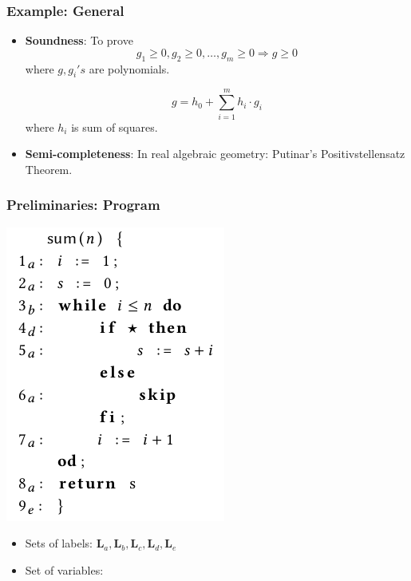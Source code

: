 \documentclass[11pt]{beamer}
\begin{document}
\begin{frame}\frametitle{Example: General}
\begin{itemize}
\item \textbf{Soundness}:
To prove 
\[g_1\ge 0, g_2\ge 0, \ldots, g_m \ge 0 \Rightarrow g \ge 0\]
where $g, g_i's$ are polynomials.

\[g = h_0 + \sum_{i = 1}^m h_i\cdot g_i\]
where $h_i$ is sum of squares.

\item \textbf{Semi-completeness}:
In real algebraic geometry: Putinar's Positivstellensatz Theorem.

\end{itemize}


\end{frame}


\begin{frame}\frametitle{Preliminaries: Program}

\begin{example}
\begin{multicols}{2}

\begin{center}
\includegraphics[scale=0.4]{example2.png}
\end{center}

\begin{itemize}

\item Sets of labels: $\mathbf{L}_a, \mathbf{L}_b, \mathbf{L}_c, \mathbf{L}_d, \mathbf{L}_e$

\item Set of variables: 


\end{itemize}
\end{multicols}
\end{example}
\end{frame}
\end{document}
